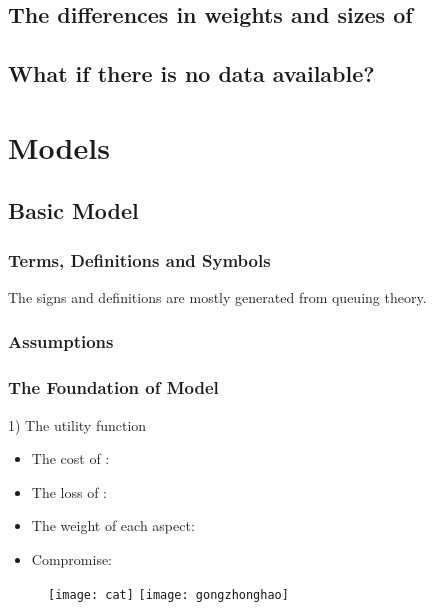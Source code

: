 \documentclass{apmcmthesis}
\begin{document}
\subsection{The differences in weights and sizes of}


\subsection{What if there is no data available?}






\section{Models}
\subsection{Basic Model}


\subsubsection{Terms, Definitions and Symbols}
The signs and definitions are mostly generated from queuing theory.


\subsubsection{Assumptions}


\subsubsection{The Foundation of Model}
1) The utility function

\begin{itemize}
  \item The cost of       :
  \item The loss of       :
  \item The weight of each aspect:
  \item Compromise:
\end{itemize}



\begin{figure}[!ht]
  \centering
  \texttt{[image: cat]}  \quad  \texttt{[image: gongzhonghao]}
  \caption{}\label{cat1}
\end{figure}
\end{document}

